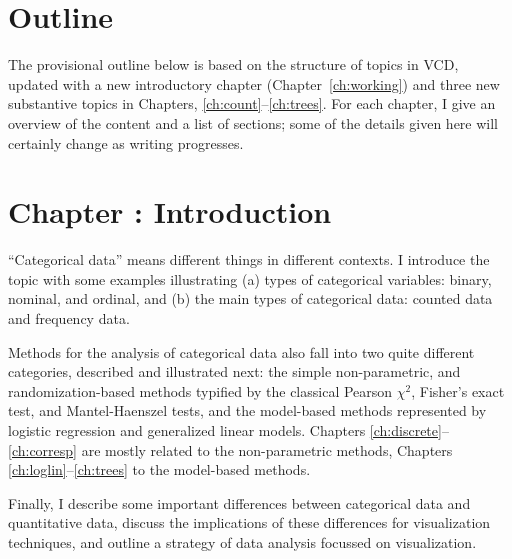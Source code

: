 \documentclass{article}
\newcommand{\Chapter}[1]{\section{Chapter \thesection: #1}}
\newcommand{\chref}[1]{Chapter~\ref{#1}}
\newcommand{\VCD}{\textsf{VCD}\xspace}
\begin{document}
%

\section*{Outline}
The provisional outline below is based on the structure of topics
in \VCD, updated with a new introductory chapter (\chref{ch:working})
and three new substantive topics in Chapters, \ref{ch:count}--\ref{ch:trees}.
For each chapter, I give an overview of the content and a list of
sections; some of the details given here will certainly change as writing
progresses.

\Chapter{Introduction}\label{ch:intro}

``Categorical data'' means different things in different
contexts.  I introduce the topic with some examples illustrating
(a) types of categorical variables: binary, nominal, and ordinal, and
(b) the main types of categorical data: counted data and frequency data.


Methods for the analysis of categorical data also fall into two
quite different categories, described and illustrated next:
the simple non-parametric, and randomization-based
methods typified by
the classical Pearson $\chi^2$, Fisher's exact test, and Mantel-Haenszel
tests, and the model-based methods represented by
logistic regression and generalized linear models.
Chapters \ref{ch:discrete}--\ref{ch:corresp}
are mostly related to the non-parametric methods, Chapters \ref{ch:loglin}--\ref{ch:trees}
to the model-based methods.

Finally, I describe some important differences between categorical data and
quantitative data,  discuss the implications of these differences for
visualization techniques, and outline a strategy of data analysis
focussed on visualization.
\end{document}
